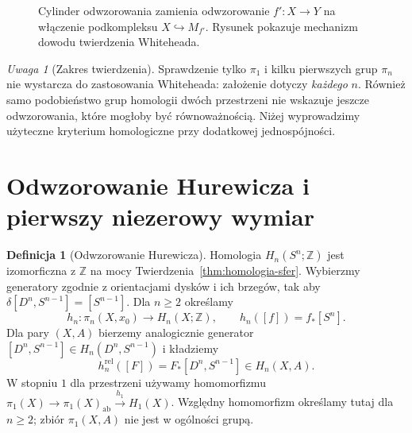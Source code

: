 \documentclass[11pt,a4paper,oneside]{report}
\newcommand{\Z}{\mathbb{Z}}
\theoremstyle{plain}
\theoremstyle{definition}
\newtheorem{definicja}[twierdzenie]{Definicja}
\theoremstyle{remark}
\newtheorem{uwaga}[twierdzenie]{Uwaga}
\begin{document}
\begin{figure}[!htbp]
\centering
{}
\caption{Cylinder odwzorowania zamienia
odwzorowanie $f':X\to Y$ na włączenie
podkompleksu $X\hookrightarrow M_{f'}$.
Rysunek pokazuje mechanizm dowodu
twierdzenia Whiteheada.}
\label{fig:cylinder-whiteheada}
\end{figure}

\begin{uwaga}[Zakres twierdzenia]
Sprawdzenie tylko $\pi_1$
i kilku pierwszych grup
$\pi_n$ nie wystarcza
do zastosowania Whiteheada:
założenie dotyczy
\emph{każdego} $n$.
Również samo podobieństwo
grup homologii dwóch
przestrzeni nie wskazuje
jeszcze odwzorowania, które
mogłoby być równoważnością.
Niżej wyprowadzimy
użyteczne kryterium
homologiczne przy
dodatkowej jednospójności.
\end{uwaga}

\section{Odwzorowanie Hurewicza i pierwszy niezerowy wymiar}
\label{sec:hurewicz-wyzszy}

\begin{definicja}[Odwzorowanie Hurewicza]
\label{def:mapa-hurewicza}
Homologia $H_n(S^n;\Z)$
jest izomorficzna z $\Z$
na mocy
Twierdzenia~\ref{thm:homologia-sfer}.
Wybierzmy generatory zgodnie z orientacjami dysków i ich brzegów,
tak aby $\delta[D^n,S^{n-1}]=[S^{n-1}]$.
Dla $n\geq2$ określamy
\[
 h_n:\pi_n(X,x_0)\longrightarrow H_n(X;\Z),
 \qquad h_n([f])=f_*[S^n].
\]
Dla pary $(X,A)$ bierzemy
analogicznie generator
$[D^n,S^{n-1}]
\in H_n(D^n,S^{n-1})$ i
kładziemy
\[
 h_n^{\mathrm{rel}}([F])
 =F_*[D^n,S^{n-1}]
 \in H_n(X,A).
\]
W stopniu $1$ dla przestrzeni używamy homomorfizmu
$\pi_1(X)\to\pi_1(X)_{\mathrm{ab}}\xrightarrow{h_1}H_1(X)$.
Względny homomorfizm określamy tutaj dla $n\geq2$;
zbiór $\pi_1(X,A)$ nie jest w ogólności grupą.
\end{definicja}
\end{document}

